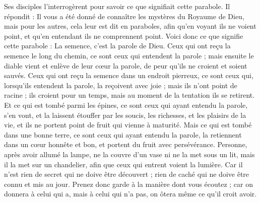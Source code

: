 \begin{multicols}{2}
Ses disciples l'interrogèrent pour savoir ce que signifiait cette parabole.
Il répondit : Il vous a été donné de connaître les mystères du Royaume de Dieu, mais pour les autres, cela leur est dit en paraboles, afin qu'en voyant ils ne voient point, et qu'en entendant ils ne comprennent point.
Voici donc ce que signifie cette parabole : La semence, c'est la parole de Dieu.
Ceux qui ont reçu la semence le long du chemin, ce sont ceux qui entendent la parole ; mais ensuite le diable vient et enlève de leur cœur la parole, de peur qu’ils ne croient et soient sauvés.
Ceux qui ont reçu la semence dans un endroit pierreux, ce sont ceux qui, lorsqu’ils entendent la parole, la reçoivent avec joie ; mais ils n'ont point de racine ; ils croient pour un temps, mais au moment de la tentation ils se retirent.
Et ce qui est tombé parmi les épines, ce sont ceux qui ayant entendu la parole, s'en vont, et la laissent étouffer par les soucis, les richesses, et les plaisirs de la vie, et ils ne portent point de fruit qui vienne à maturité.
Mais ce qui est tombé dans une bonne terre, ce sont ceux qui ayant entendu la parole, la retiennent dans un cœur honnête et bon, et portent du fruit avec persévérance.
Personne, après avoir allumé la lampe, ne la couvre d'un vase ni ne la met sous un lit, mais il la met sur un chandelier, afin que ceux qui entrent voient la lumière.
Car il n’est rien de secret qui ne doive être découvert ; rien de caché qui ne doive être connu et mis au jour.
Prenez donc garde à la manière dont vous écoutez ; car on donnera à celui qui a, mais à celui qui n’a pas, on ôtera même ce qu’il croit avoir.
\end{multicols}
